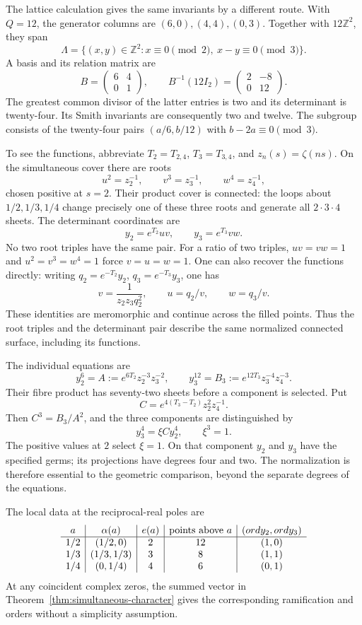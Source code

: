 The lattice calculation gives the same invariants by a different route.
With \(Q=12\), the generator columns are \((6,0),(4,4),(0,3)\).
Together with \(12\mathbb Z^2\), they span
\[
 \Lambda=\{(x,y)\in\mathbb Z^2:x\equiv0\pmod2,
                                      \ x-y\equiv0\pmod3\}.
\]
A basis and its relation matrix are
\[
 B=\begin{pmatrix}6&4\\0&1\end{pmatrix},\qquad
 B^{-1}(12I_2)=\begin{pmatrix}2&-8\\0&12\end{pmatrix}.
\]
The greatest common divisor of the latter entries is two and its
determinant is twenty-four.  Its Smith invariants are consequently two
and twelve.  The subgroup consists of the twenty-four pairs
\((a/6,b/12)\) with \(b-2a\equiv0\pmod3\).

To see the functions, abbreviate \(T_2=T_{2,4}\), \(T_3=T_{3,4}\),
and \(z_n(s)=\zeta(ns)\).  On the simultaneous cover there are roots
\[
 u^2=z_2^{-1},\qquad v^3=z_3^{-1},\qquad w^4=z_4^{-1},
\]
chosen positive at \(s=2\).  Their product cover is connected: the
loops about \(1/2,1/3,1/4\) change precisely one of these three
roots and generate all \(2\cdot3\cdot4\) sheets.  The determinant
coordinates are
\[
 y_2=e^{T_2}uv,\qquad y_3=e^{T_3}vw.
\]
No two root triples have the same pair.  For a ratio of two triples,
\(uv=vw=1\) and \(u^2=v^3=w^4=1\) force \(v=u=w=1\).
One can also recover the functions directly: writing
\(q_2=e^{-T_2}y_2\), \(q_3=e^{-T_3}y_3\), one has
\[
 v=\frac1{z_2z_3q_2^2},\qquad u=q_2/v,\qquad w=q_3/v.
\]
These identities are meromorphic and continue across the filled points.
Thus the root triples and the determinant pair describe the same
normalized connected surface, including its functions.

The individual equations are
\[
 y_2^6=A:=e^{6T_2}z_2^{-3}z_3^{-2},\qquad
 y_3^{12}=B_3:=e^{12T_3}z_3^{-4}z_4^{-3}.
\]
Their fibre product has seventy-two sheets before a component is
selected.  Put
\[
 C=e^{4(T_3-T_2)}z_2^2z_4^{-1}.
\]
Then \(C^3=B_3/A^2\), and the three components are distinguished by
\[
 y_3^4=\xi C y_2^4,\qquad \xi^3=1.
\]
The positive values at \(2\) select \(\xi=1\).  On that component
\(y_2\) and \(y_3\) have the specified germs; its projections have
degrees four and two.  The normalization is therefore essential to the
geometric comparison, beyond the separate degrees of the equations.

The local data at the reciprocal-real poles are
\[
\begin{array}{c|c|c|c|c}
 a&\alpha(a)&e(a)&\text{points above }a&
        (ord y_2,ord y_3)\\\hline
 1/2&(1/2,0)&2&12&(1,0)\\
 1/3&(1/3,1/3)&3&8&(1,1)\\
 1/4&(0,1/4)&4&6&(0,1)
\end{array}
\]
At any coincident complex zeros, the summed vector in
Theorem~\ref{thm:simultaneous-character} gives the corresponding
ramification and orders without a simplicity assumption.

